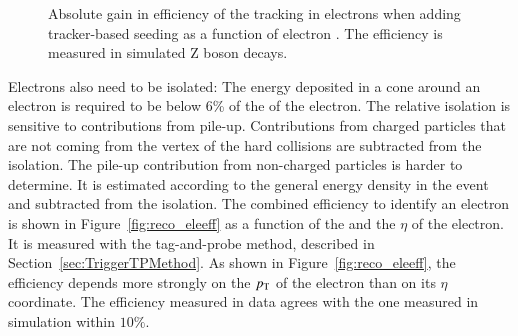 \begin{figure}[htbp!]
  \begin{center}
\caption{Absolute gain in efficiency of the tracking in electrons when adding tracker-based seeding as a function of electron \pt\cite{Sirunyan:2017ulk}. 
         The efficiency is measured in simulated Z boson decays.
  \label{fig:reco_eletrackseed}}
  \end{center}
\end{figure}

Electrons also need to be isolated: The energy deposited in a cone around an electron is required to be below 6\% of the \pt of the electron.
The relative isolation is sensitive to contributions from pile-up. Contributions from charged particles that are not coming from the vertex of the hard collisions
are subtracted from the isolation. The pile-up contribution from non-charged particles is harder to determine. It is estimated according to the general energy density
in the event and subtracted from the isolation.
The combined efficiency to identify an electron is shown in Figure~\ref{fig:reco_eleeff} as a function of the \pt and the $\eta$ of the electron.
It is measured with the tag-and-probe method, described in Section~\ref{sec:TriggerTPMethod}.
As shown in Figure~\ref{fig:reco_eleeff}, the efficiency depends more strongly on the $p_{\mathrm{T}}$ of the electron than on its $\eta$ coordinate. 
The efficiency measured in data agrees with the one measured in simulation within $10\%$. 

